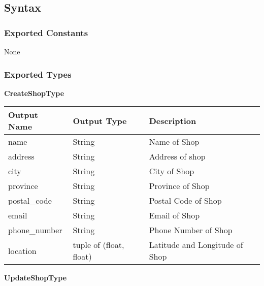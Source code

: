 \documentclass[12pt, titlepage]{article}
\begin{document}
\subsection{Syntax}

\subsubsection{Exported Constants}

None

\subsubsection{Exported Types}

\textbf{CreateShopType}

\begin{table}[H]
	\begin{tabular}{|p{}|p{}|p{}|}
		\hline
		\textbf{Output Name} & \textbf{Output Type}    & \textbf{Description}           \\
		\hline
		name                 & String                  & Name of Shop                   \\
		\hline
		address              & String                  & Address of shop                \\
		\hline
		city                 & String                  & City of Shop                   \\
		\hline
		province             & String                  & Province of Shop               \\
		\hline
		postal\_code         & String                  & Postal Code of Shop            \\
		\hline
		email                & String                  & Email of Shop                  \\
		\hline
		phone\_number        & String                  & Phone Number of Shop           \\
		\hline
		location             & tuple of (float, float) & Latitude and Longitude of Shop \\
		\hline
	\end{tabular}
\end{table}

\textbf{UpdateShopType}
\end{document}
